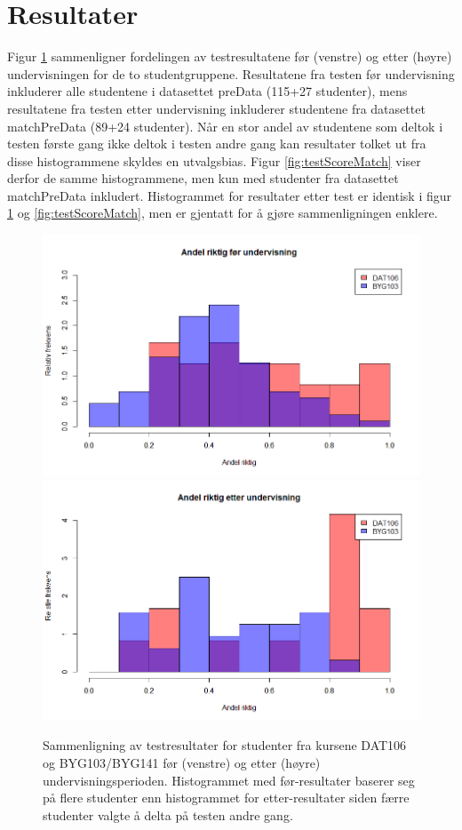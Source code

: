 \documentclass[a4paper,norsk,12pt]{report}
\begin{document}
\section{Resultater}
Figur \ref{fig:testScore} sammenligner fordelingen av testresultatene før (venstre) og etter (høyre) undervisningen for de to studentgruppene. Resultatene fra testen før undervisning inkluderer alle studentene i datasettet preData (115+27 studenter), mens resultatene fra testen etter undervisning inkluderer studentene fra datasettet matchPreData (89+24 studenter). Når en stor andel av studentene som deltok i testen første gang ikke deltok i testen andre gang kan resultater tolket ut fra disse histogrammene skyldes en utvalgsbias. Figur \ref{fig:testScoreMatch} viser derfor de samme histogrammene, men kun med studenter fra datasettet matchPreData inkludert. Histogrammet for resultater etter test er identisk i figur \ref{fig:testScore} og \ref{fig:testScoreMatch}, men er gjentatt for å gjøre sammenligningen enklere.
\begin{figure}[p]
	\includegraphics[width=.48\textwidth]{./preScoreAll}
	\includegraphics[width=.48\textwidth]{./postScore}
	\caption{Sammenligning av testresultater for studenter fra kursene DAT106 og  BYG103/BYG141 før (venstre) og etter (høyre) undervisningsperioden. Histogrammet med før-resultater 
baserer seg på flere studenter enn histogrammet for etter-resultater siden færre studenter valgte å delta på testen andre gang.}
	\label{fig:testScore}
\end{figure}
\end{document}
